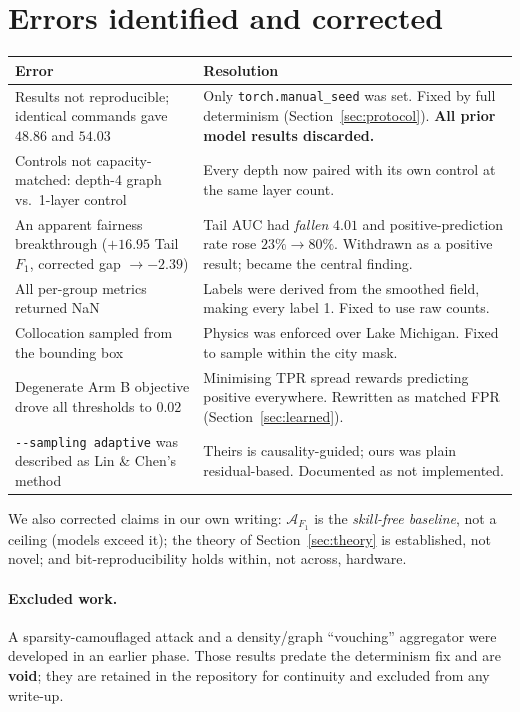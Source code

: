 \documentclass[11pt,a4paper]{article}
\newcommand{\A}{\mathcal{A}}
\begin{document}
\section{Errors identified and corrected}\label{sec:mistakes}
\begin{center}
\begin{tabular}{p{5cm}p{9.8cm}}
\toprule
\textbf{Error} & \textbf{Resolution} \\
\midrule
Results not reproducible; identical commands gave $48.86$ and $54.03$ & Only \texttt{torch.manual\_seed} was set. Fixed by full determinism (Section~\ref{sec:protocol}). \textbf{All prior model results discarded.} \\
\addlinespace
Controls not capacity-matched: depth-4 graph vs.\ 1-layer control & Every depth now paired with its own control at the same layer count. \\
\addlinespace
An apparent fairness breakthrough ($+16.95$ Tail $F_1$, corrected gap $\to -2.39$) & Tail AUC had \emph{fallen} $4.01$ and positive-prediction rate rose $23\% \to 80\%$. Withdrawn as a positive result; became the central finding. \\
\addlinespace
All per-group metrics returned NaN & Labels were derived from the smoothed field, making every label 1. Fixed to use raw counts. \\
\addlinespace
Collocation sampled from the bounding box & Physics was enforced over Lake Michigan. Fixed to sample within the city mask. \\
\addlinespace
Degenerate Arm B objective drove all thresholds to $0.02$ & Minimising TPR spread rewards predicting positive everywhere. Rewritten as matched FPR (Section~\ref{sec:learned}). \\
\addlinespace
\texttt{-{}-sampling adaptive} was described as Lin \& Chen's method & Theirs is causality-guided; ours was plain residual-based. Documented as not implemented. \\
\bottomrule
\end{tabular}
\end{center}
\noindent We also corrected claims in our own writing: $\A_{F_1}$ is the
\emph{skill-free baseline}, not a ceiling (models exceed it); the theory of
Section~\ref{sec:theory} is established, not novel; and bit-reproducibility
holds within, not across, hardware.

\paragraph{Excluded work.} A sparsity-camouflaged attack and a density/graph
``vouching'' aggregator were developed in an earlier phase. Those results
predate the determinism fix and are \textbf{void}; they are retained in the
repository for continuity and excluded from any write-up.
\end{document}
